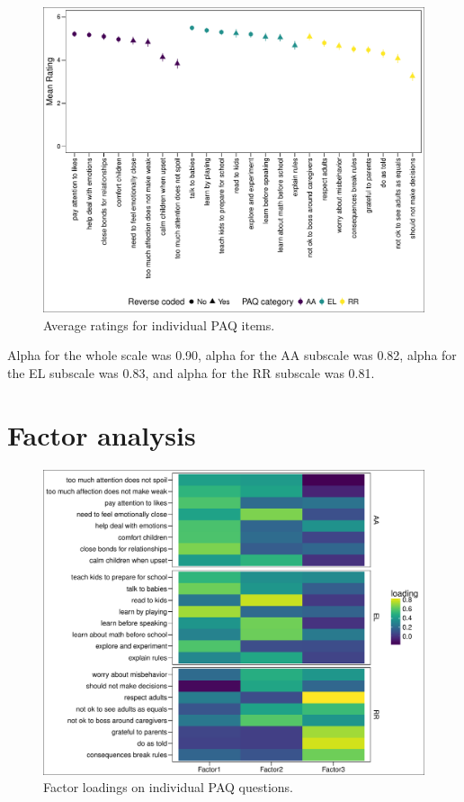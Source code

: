 \documentclass[man]{apa6}
\theoremstyle{definition}
\theoremstyle{definition}
\theoremstyle{definition}
\theoremstyle{remark}
\begin{document}
\begin{figure}
\centering
\includegraphics{PAQ_paper_files/figure-latex/sentratings-1.pdf}
\caption{\label{fig:sentratings}Average ratings for individual PAQ items.}
\end{figure}

Alpha for the whole scale was 0.90, alpha for the AA subscale was 0.82,
alpha for the EL subscale was 0.83, and alpha for the RR subscale was
0.81.

\section{Factor analysis}\label{factor-analysis}

\begin{figure}
\centering
\includegraphics{PAQ_paper_files/figure-latex/factors-1.pdf}
\caption{\label{fig:factors}Factor loadings on individual PAQ questions.}
\end{figure}
\end{document}
